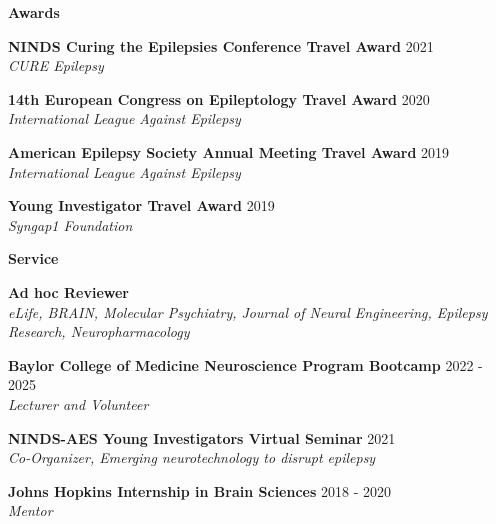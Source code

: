 \documentclass{resume} %
\begin{document}
\begin{rSection}{{\bfseries Awards}}

    {\bfseries NINDS Curing the Epilepsies Conference Travel Award} \hfill {2021}
    \\ \emph{CURE Epilepsy} \vspace{0.3\baselineskip}

    {\bfseries 14th European Congress on Epileptology Travel Award} \hfill {2020}
    \\ \emph{International League Against Epilepsy} \vspace{0.3\baselineskip}

    {\bfseries American Epilepsy Society Annual Meeting Travel Award} \hfill {2019}
    \\ \emph{International League Against Epilepsy} \vspace{0.3\baselineskip}

    {\bfseries Young Investigator Travel Award} \hfill {2019}
    \\ \emph{Syngap1 Foundation}

\end{rSection}

\begin{rSection}{{\bfseries Service}}

    {\bfseries Ad hoc Reviewer}
    \\ \emph{eLife, BRAIN, Molecular Psychiatry, Journal of Neural Engineering, Epilepsy Research, Neuropharmacology} \vspace{0.3\baselineskip}

    {\bfseries Baylor College of Medicine Neuroscience Program Bootcamp} \hfill {2022 - 2025}
    \\ \emph{Lecturer and Volunteer} \vspace{0.3\baselineskip}

    {\bfseries NINDS-AES Young Investigators Virtual Seminar} \hfill {2021}
    \\ \emph{Co-Organizer, Emerging neurotechnology to disrupt epilepsy} \vspace{0.3\baselineskip}

    {\bfseries Johns Hopkins Internship in Brain Sciences} \hfill {2018 - 2020}
    \\ \emph{Mentor}

\end{rSection}
\end{document}
